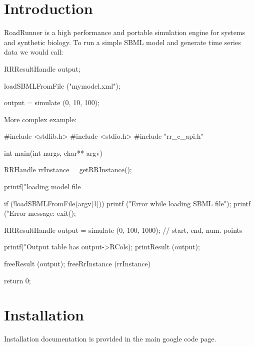 \hypertarget{index_intro_sec}{}\section{\-Introduction}\label{index_intro_sec}
\-Road\-Runner is a high performance and portable simulation engine for systems and synthetic biology. \-To run a simple \-S\-B\-M\-L model and generate time series data we would call\-:


\begin{DoxyCode}
 RRResultHandle output;

 loadSBMLFromFile ("mymodel.xml");

 output = simulate (0, 10, 100);
\end{DoxyCode}


\-More complex example\-:


\begin{DoxyCode}
 #include <stdlib.h>
 #include <stdio.h>
 #include "rr_c_api.h"

 int main(int nargs, char** argv)
 {
        RRHandle rrInstance = getRRInstance();

        printf("loading model file %
 
        if (!loadSBMLFromFile(argv[1])) {
           printf ("Error while loading SBML file\n");
           printf ("Error message: %
           exit();
        }
                   
        RRResultHandle output = simulate (0, 100, 1000);  // start, end, num.
       points
        
        printf("Output table has %
       output->RCols);
        printResult (output);
        
        freeResult (output);
        freeRrInstance (rrInstance)

        return 0;
 }
\end{DoxyCode}
 \hypertarget{index_install_sec}{}\section{\-Installation}\label{index_install_sec}
\-Installation documentation is provided in the main google code page. 